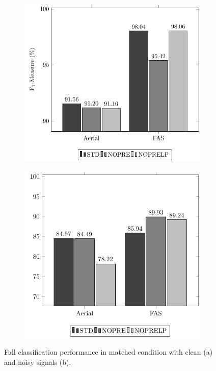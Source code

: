 \begin{figure}[t]
	\centering
	\begin{subfigure}[b]{0.6\textwidth}
		\includegraphics[width=\textwidth]{img/pgfsources/16_matched_clean/16_matched_CLEAN.pdf}
		\caption{}\label{fig:results_match_clean}
	\end{subfigure}
	\begin{subfigure}[b]{0.6\textwidth}
		\includegraphics[width=\textwidth]{img/pgfsources/16_matched_noisy/16_matched_NOISY.pdf}
		\caption{}\label{fig:results_match_noisy}
	\end{subfigure}
	\caption{Fall classification performance in matched condition with clean (a) and noisy signals (b).} \label{fig:results_match}
\end{figure}

